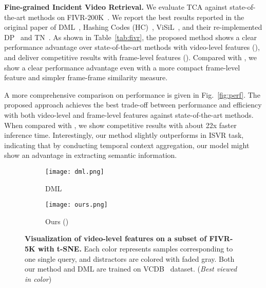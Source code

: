\documentclass[10pt,twocolumn,letterpaper]{article}
\begin{document}
\noindent\textbf{Fine-grained Incident Video Retrieval.} \label{paragraph:fivr}
We evaluate TCA against state-of-the-art methods on FIVR-200K~\cite{kordopatis2019fivr}. We report the best results reported in the original paper of DML~\cite{kordopatis2017dml}, Hashing Codes (HC)~\cite{song2013effective}, ViSiL~\cite{kordopatis2019visil}, and their re-implemented DP~\cite{chou2015pattern} and TN~\cite{tan2009scalable}. As shown in Table~\ref{tab:fivr}, the proposed method shows a clear performance advantage over state-of-the-art methods with video-level features (), and deliver competitive results with frame-level features ().
Compared with , we show a clear performance advantage even with a more compact frame-level feature and simpler frame-frame similarity measure.

A more comprehensive comparison on performance is given in Fig.~\ref{fig:perf}. The proposed approach achieves the best trade-off between performance and efficiency with both video-level and frame-level features against state-of-the-art methods.
When compared with , we show competitive results with about 22x faster inference time. Interestingly, our method slightly outperforms  in ISVR task, indicating that by conducting temporal context aggregation, our model might show an advantage in extracting semantic information.

\begin{figure}[htb]
\begin{subfigure}{.49\textwidth}
  \centering
\texttt{[image: dml.png]}  
  \caption{DML~\cite{kordopatis2017dml}}
  \label{fig:dml}
\end{subfigure}
\begin{subfigure}{.49\textwidth}
  \centering
\texttt{[image: ours.png]}  
  \caption{Ours ()}
  \label{fig:ours}
\end{subfigure}
\caption{\textbf{Visualization of video-level features on a subset of FIVR-5K with t-SNE.} Each color represents samples corresponding to one single query, and distractors are colored with faded gray. Both our method and DML are trained on VCDB~\cite{jiang2014vcdb} dataset. (\textit{Best viewed in color})}
\label{fig:tsne}
\end{figure}
\end{document}
